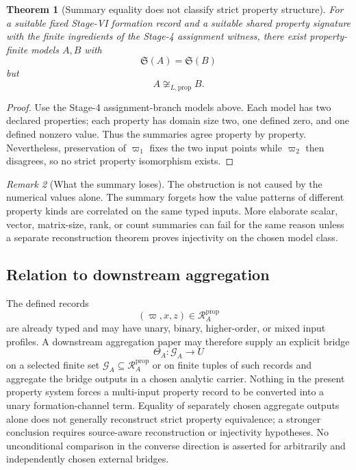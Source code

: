 \documentclass[11pt]{article}
\newcommand{\PropRec}{\mathcal R^{\mathrm{prop}}}
\newtheorem{theorem}{Theorem}[section]
\theoremstyle{definition}
\theoremstyle{remark}
\newtheorem{remark}[theorem]{Remark}
\begin{document}
\begin{theorem}[Summary equality does not classify strict property structure]
\label{thm:compression}
For a suitable fixed Stage-VI formation record and a suitable
shared property signature with the finite ingredients of the
Stage-4 assignment witness, there exist property-finite models
\(A,B\) with
\[
\mathfrak S(A)=\mathfrak S(B)
\]
but
\[
A\not\cong_{L,\mathrm{prop}}B.
\]
\end{theorem}

\begin{proof}
Use the Stage-4 assignment-branch models above.
Each model has two declared properties; each property has domain size two, one defined zero, and one defined nonzero value.
Thus the summaries agree property by property.
Nevertheless, preservation of \(\varpi_1\) fixes the two input points while \(\varpi_2\) then disagrees, so no strict property isomorphism exists.
\end{proof}

\begin{remark}[What the summary loses]
The obstruction is not caused by the numerical values alone.
The summary forgets how the value patterns of different property kinds are correlated on the same typed inputs.
More elaborate scalar, vector, matrix-size, rank, or count summaries can fail for the same reason unless a separate reconstruction theorem proves injectivity on the chosen model class.
\end{remark}

\subsection{Relation to downstream aggregation}

The defined records
\[
(\varpi,x,z)\in\PropRec_A
\]
are already typed and may have unary, binary, higher-order, or mixed input profiles.
A downstream aggregation paper may therefore supply an explicit bridge
\[
\Theta_A:\mathcal G_A\longrightarrow U
\]
on a selected finite set \(\mathcal G_A\subseteq\PropRec_A\) or on finite tuples of such records and aggregate the bridge outputs in a chosen analytic carrier.
Nothing in the present property system forces a multi-input property record to be converted into a unary formation-channel term.
Equality of separately chosen aggregate outputs alone does not generally reconstruct strict property equivalence; a stronger conclusion requires source-aware reconstruction or injectivity hypotheses.
No unconditional comparison in the converse direction is asserted for arbitrarily and independently chosen external bridges.
\end{document}
